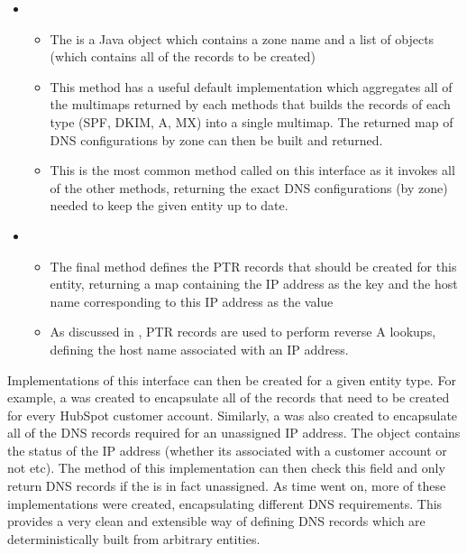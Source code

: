 \begin{itemize}
      \item{}
      \begin{itemize}
            \item{The  is a Java object which contains a zone name and a list of  objects (which contains all of the records to be created)}
            \item{This method has a useful default implementation which aggregates all of the multimaps returned by each methods that builds the records of each type (SPF, DKIM, A, MX) into a single multimap. The returned map of DNS configurations by zone can then be built and returned.}
            \item{This is the most common method called on this interface as it invokes all of the other methods, returning the exact DNS configurations (by zone) needed to keep the given entity up to date.}
      \end{itemize}

      \item{}
      \begin{itemize}
            \item{The final method defines the PTR records that should be created for this entity, returning a map containing the IP address as the key and the host name corresponding to this IP address as the value}
            \item{As discussed in , PTR records are used to perform reverse A lookups, defining the host name associated with an IP address.}
      \end{itemize}
\end{itemize}

Implementations of this interface can then be created for a given entity type. For example, a  was created to encapsulate all of the records that need to be created for every HubSpot customer account. Similarly, a  was also created to encapsulate all of the DNS records required for an unassigned IP address. The  object contains the status of the IP address (whether its associated with a customer account or not etc). The  method of this implementation can then check this field and only return DNS records if the  is in fact unassigned. As time went on, more of these  implementations were created, encapsulating different DNS requirements. This provides a very clean and extensible way of defining DNS records which are deterministically built from arbitrary entities.

